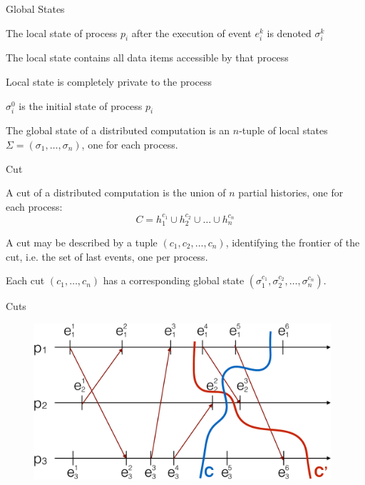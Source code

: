 \begin{frame}{Global States}
	
\begin{definition}
\BI
\item The \alert{local state} of process $p_i$ after the execution of
  event $e_i^k$ is denoted $\sigma_i^k$
\item The local state contains all data items accessible by that process
\item Local state is completely private to the process
\item $\sigma_i^0$ is the \alert{initial state} of process $p_i$
\EI
\end{definition}
\bigskip
\begin{definition}
The \alert{global state} of a distributed computation is an $n$-tuple of local
  states $\Sigma = (\sigma_1, \ldots, \sigma_n)$, one for each process.
\end{definition}

\end{frame}

\begin{frame}{Cut}

\begin{definition}[Cut]
A \alert{cut} of a distributed computation is the union of $n$ partial
  histories, one for each process:
\[
  C = h_1^{c_1} \cup h_2^{c_2} \cup \ldots \cup h_n^{c_n}
\]
\end{definition}

\bigskip
\BIL
\item A cut may be described by a tuple $(c_1, c_2, \ldots, c_n)$, 
  identifying the \alert{frontier} of the cut, i.e. the set of last events,
  one per process.
\item Each cut $(c_1, \ldots, c_n)$ has a corresponding global state
$(\sigma_1^{c_1}, \sigma_2^{c_2}, \ldots, \sigma_n^{c_n})$.
\EIL
\end{frame}

\begin{frame}{Cuts}

\begin{figure} 
\includegraphics[width=11cm]{figs/03/diagram2}
\end{figure}
\end{frame}

